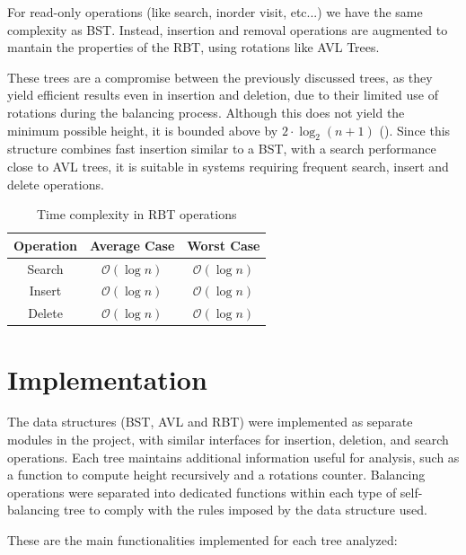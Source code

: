 \documentclass[12pt,a4paper]{article}
\begin{document}
        For read-only operations (like search, inorder visit, etc...) we have the same complexity as BST. Instead, insertion and removal operations are augmented to mantain the properties of the RBT, using rotations like AVL Trees.

        These trees are a compromise between the previously discussed trees, as they yield efficient results even in insertion and deletion, due to their limited use of rotations during the balancing process. Although this does not yield the minimum possible height, it is bounded above by $2 \cdot \log_2 (n+1)$ (\textcite[332]{cormen2022}). Since this structure combines fast insertion similar to a BST, with a search performance close to AVL trees, it is suitable in systems requiring frequent search, insert and delete operations.

        \begin{table}[ht]
            \centering
                \begin{tabular}{c|c|c}
                    \hline
                    \textbf{Operation} & \textbf{Average Case} & \textbf{Worst Case} \\
                    \hline
                    Search & $\mathcal{O}(\log n)$ & $\mathcal{O}(\log n)$ \\
                    Insert & $\mathcal{O}(\log n)$ & $\mathcal{O}(\log n)$ \\
                    Delete & $\mathcal{O}(\log n)$ & $\mathcal{O}(\log n)$ \\
                    \hline
                \end{tabular}
                \caption{Time complexity in RBT operations}
        \end{table}

    \section{Implementation}

        The data structures (BST, AVL and RBT) were implemented as separate modules in the project, with similar interfaces for insertion, deletion, and search operations. Each tree maintains additional information useful for analysis, such as a function to compute height recursively and a rotations counter. Balancing operations were separated into dedicated functions within each type of self-balancing tree to comply with the rules imposed by the data structure used.

        These are the main functionalities implemented for each tree analyzed:
\end{document}
